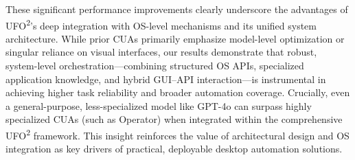 \documentclass[sigplan,10pt]{acmart}
\newcommand{\name}{\textsc{UFO}\textsuperscript{2}\xspace}
\begin{document}
These significant performance improvements clearly underscore the advantages of \name's deep integration with OS-level mechanisms and its unified system architecture. While prior CUAs primarily emphasize model-level optimization or singular reliance on visual interfaces, our results demonstrate that robust, system-level orchestration—combining structured OS APIs, specialized application knowledge, and hybrid GUI–API interaction—is instrumental in achieving higher task reliability and broader automation coverage. Crucially, even a general-purpose, less-specialized model like GPT-4o can surpass highly specialized CUAs (such as Operator) when integrated within the comprehensive \name framework. This insight reinforces the value of architectural design and OS integration as key drivers of practical, deployable desktop automation solutions.
\end{document}
